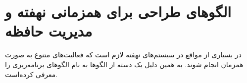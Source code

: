 \section{الگوهای طراحی برای همزمانی نهفته و مدیریت حافظه}
\begin{RTL}
در بسیاری از مواقع در سیستم‌های نهفته لازم است که فعالیت‌های متنوع به صورت همزمان
انجام شوند. به همین دلیل 
\cite{ref1} یک دسته از الگوها به نام الگوهای برنامه‌ریزی
را معرفی کرده‌است.
\end{RTL}







